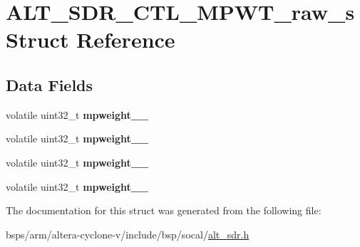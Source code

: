 \hypertarget{structALT__SDR__CTL__MPWT__raw__s}{}\section{A\+L\+T\+\_\+\+S\+D\+R\+\_\+\+C\+T\+L\+\_\+\+M\+P\+W\+T\+\_\+raw\+\_\+s Struct Reference}
\label{structALT__SDR__CTL__MPWT__raw__s}
\subsection*{Data Fields}
\begin{DoxyCompactItemize}
\item 
\mbox{\label{structALT__SDR__CTL__MPWT__raw__s_a33aae4cd2c01e27b8bf5fa7964644d11}} 
volatile uint32\+\_\+t {\bfseries mpweight\+\_\+\_}
\item 
\mbox{\label{structALT__SDR__CTL__MPWT__raw__s_abdbea41d67a17811ae6b264f9a56bcf8}} 
volatile uint32\+\_\+t {\bfseries mpweight\+\_\+\_}
\item 
\mbox{\label{structALT__SDR__CTL__MPWT__raw__s_ad3a5bb9985ff7ff6c9b3dbba5ead326a}} 
volatile uint32\+\_\+t {\bfseries mpweight\+\_\+\_}
\item 
\mbox{\label{structALT__SDR__CTL__MPWT__raw__s_af1b8a0fd633b8cd1a1c71adc0333417d}} 
volatile uint32\+\_\+t {\bfseries mpweight\+\_\+\_}
\end{DoxyCompactItemize}


The documentation for this struct was generated from the following file\+:\begin{DoxyCompactItemize}
\item 
bsps/arm/altera-\/cyclone-\/v/include/bsp/socal/\mbox{\hyperlink{alt__sdr_8h}{alt\+\_\+sdr.\+h}}\end{DoxyCompactItemize}
